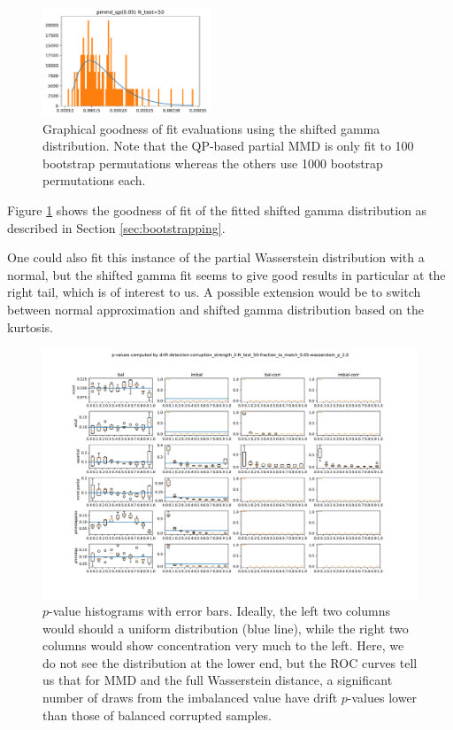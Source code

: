 \documentclass[a4paper,twoside,10pt]{article}
\theoremstyle{plain}
\theoremstyle{remark}
\begin{document}
\begin{figure}
\includegraphics[width=5cm]{experiment/v1/experiment.stl10rn18.run_0.corruption_strength_2-N_test_50-fraction_to_match_0.05-wasserstein_p_2.0.pmmd_qp_fit.pdf}
\caption{\label{fig:goodness-of-fit} Graphical goodness of fit evaluations using the shifted gamma distribution. Note that the QP-based partial MMD is only fit to 100 bootstrap permutations whereas the others use 1000 bootstrap permutations each.}
\end{figure}

Figure \ref{fig:goodness-of-fit} shows the goodness of fit of the fitted shifted gamma distribution as described in Section \ref{sec:bootstrapping}.

One could also fit this instance of the partial Wasserstein distribution with a normal, but the shifted gamma fit seems to give good results in particular at the right tail, which is of interest to us. A possible extension would be to switch between normal approximation and shifted gamma distribution based on the kurtosis.

\begin{figure}
  \includegraphics[width=15cm]{experiment/v1/deciles_with_error_bars_base.pdf}
  \caption{\label{fig:histograms} $p$-value histograms with error bars. Ideally, the left two columns would should a uniform distribution (blue line), while the right two columns would show concentration very much to the left. Here, we do not see the distribution at the lower end, but the ROC curves tell us that for MMD and the full Wasserstein distance, a significant number of draws from the imbalanced value have drift $p$-values lower than those of balanced corrupted samples.}
\end{figure}
\end{document}
